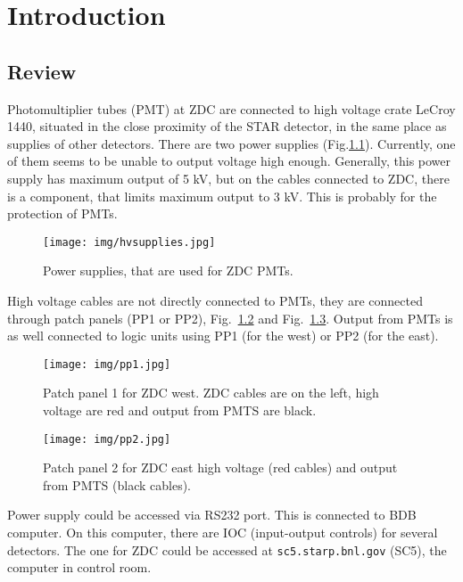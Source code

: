 \chapter{Introduction}
\section{Review}
Photomultiplier tubes (PMT) at ZDC are connected to high voltage crate LeCroy 1440, situated in the close proximity of the STAR detector, in the same place as supplies of other detectors. There are two power supplies (Fig.\ref{hvsupplies}). Currently, one of them seems to be unable to output voltage high enough. Generally, this power supply has maximum output of 5 kV, but on the cables connected to ZDC, there is a component, that limits maximum output to 3 kV. This is probably for the protection of PMTs.

\begin{figure}[htb]
\begin{center}
\texttt{[image: img/hvsupplies.jpg]}
\end{center}
\caption{Power supplies, that are used for ZDC PMTs.}
\label{hvsupplies}
\end{figure}

High voltage cables are not directly connected to PMTs, they are connected through patch panels (PP1 or PP2), Fig.~\ref{pp1} and Fig.~\ref{pp2}. Output from PMTs is as well connected to logic units using PP1 (for the west) or PP2 (for the east).

\begin{figure}[htb]
\begin{center}
\texttt{[image: img/pp1.jpg]}
\end{center}
\caption{Patch panel 1 for ZDC west.  ZDC cables are on the left, high voltage are red and output from PMTS are black.}
\label{pp1}
\end{figure}

\begin{figure}[htb]
\begin{center}
\texttt{[image: img/pp2.jpg]}
\end{center}
\caption{Patch panel 2 for ZDC east high voltage (red cables) and output from PMTS (black cables).}
\label{pp2}
\end{figure}

Power supply could be accessed via RS232 port. This is connected to BDB computer. On this computer, there are IOC (input-output controls) for several detectors. The one for ZDC could be accessed at \texttt{sc5.starp.bnl.gov} (SC5), the computer in control room.


